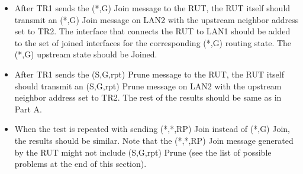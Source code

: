 \documentclass[11pt]{report}
\begin{document}
\begin{itemize}

  \item After TR1 sends the (*,G) Join message to the RUT, the RUT itself
  should transmit an (*,G) Join message on LAN2 with the upstream neighbor
  address set to TR2. The interface that connects the RUT to LAN1 should be
  added to the set of joined interfaces for the corresponding (*,G) routing
  state. The (*,G) upstream state should be Joined.

  \item After TR1 sends the (S,G,rpt) Prune message to the RUT, the RUT itself
  should transmit an (S,G,rpt) Prune message on LAN2 with the upstream
  neighbor address set to TR2. The rest of the results should be same as in
  Part A.

  \item When the test is repeated with sending (*,*,RP) Join instead of (*,G)
  Join, the results should be similar.
  Note that the (*,*,RP) Join message generated by the RUT might not include
  (S,G,rpt) Prune (see the list of possible problems at the end of this
  section).

\end{itemize}

\end{document}
